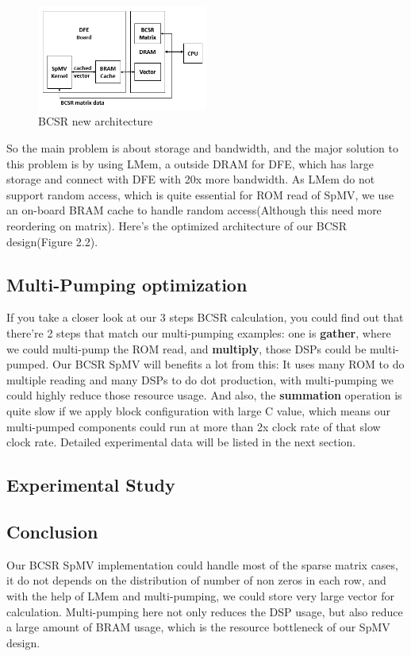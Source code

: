 \documentclass[a4paper, 10pt]{report}
\begin{document}
\begin{figure}[h!]
  \caption{BCSR new architecture}
  \centering
    \includegraphics[width=0.5\textwidth]{bcsr-opt}
\end{figure}

So the main problem is about storage and bandwidth, and the major solution to this problem is by using LMem, a outside DRAM for DFE, which has large storage and connect with DFE with 20x more bandwidth. As LMem do not support random access, which is quite essential for ROM read of SpMV, we use an on-board BRAM cache to handle random access(Although this need more reordering on matrix). Here's the optimized architecture of our BCSR design(Figure 2.2).

\subsection{Multi-Pumping optimization}
If you take a closer look at our 3 steps BCSR calculation, you could find out that there're 2 steps that match our multi-pumping examples: one is \textbf{gather}, where we could multi-pump the ROM read, and \textbf{multiply}, those DSPs could be multi-pumped. Our BCSR SpMV will benefits a lot from this: It uses many ROM to do multiple reading and many DSPs to do dot production, with multi-pumping we could highly reduce those resource usage. And also, the \textbf{summation} operation is quite slow if we apply block configuration with large C value, which means our multi-pumped components could run at more than 2x clock rate of that slow clock rate. Detailed experimental data will be listed in the next section.

\subsection{Experimental Study}

\subsection{Conclusion}
Our BCSR SpMV implementation could handle most of the sparse matrix cases, it do not depends on the distribution of number of non zeros in each row, and with the help of LMem and multi-pumping, we could store very large vector for calculation. Multi-pumping here not only reduces the DSP usage, but also reduce a large amount of BRAM usage, which is the resource bottleneck of our SpMV design. 
\end{document}
